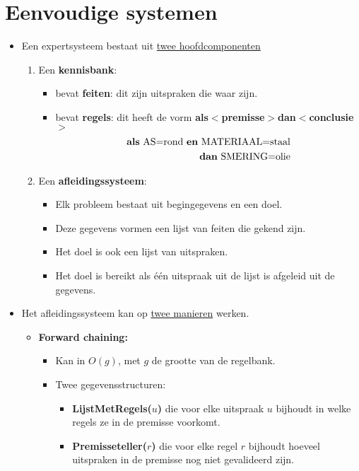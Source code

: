 \section{Eenvoudige systemen}
\begin{itemize}
	\item Een expertsysteem bestaat uit \underline{twee hoofdcomponenten}
	\begin{enumerate}
		\item Een \textbf{kennisbank}:
		\begin{itemize}
			\item bevat \textbf{feiten}: dit zijn uitspraken die waar zijn.
			\item bevat \textbf{regels}: dit heeft de vorm \textbf{als$<$premisse$>$dan$<$conclusie$>$}
			\begin{equation*}
				\begin{split}
					\hbox{\textbf{als} AS=rond \textbf{en} MATERIAAL=staal} \\
					\hbox{\textbf{dan} SMERING=olie} 
				\end{split}
			\end{equation*}
		\end{itemize}
		\item Een \textbf{afleidingssysteem}:
		\begin{itemize}
			\item Elk probleem bestaat uit begingegevens en een doel.
			\item Deze gegevens vormen een lijst van feiten die gekend zijn.
			\item Het doel is ook een lijst van uitspraken.
			\item Het doel is bereikt als één uitspraak uit de lijst is afgeleid uit de gegevens.
		\end{itemize}
	\end{enumerate}
	\item Het afleidingssysteem kan op \underline{twee manieren} werken.
	\begin{itemize}
		\item \textbf{Forward chaining:}
		\begin{itemize}
			\item Kan in $O(g)$, met $g$ de grootte van de regelbank.
			\item Twee gegevensstructuren:
			\begin{itemize}
				\item \textbf{LijstMetRegels($u$)} die voor elke uitspraak $u$ bijhoudt in welke regels ze in de premisse voorkomt.
				\item \textbf{Premisseteller($r$)} die voor elke regel $r$ bijhoudt hoeveel uitspraken in de premisse nog niet gevalideerd zijn.

\end{itemize}
\end{itemize}
\end{itemize}
\end{itemize}
